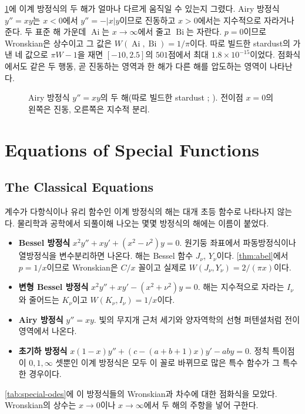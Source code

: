 \cref{fig:airy}에 이계 방정식의 두 해가 얼마나 다르게 움직일 수 있는지 그렸다. Airy 방정식 $y''=xy$는 $x<0$에서 $y''=-|x|y$이므로 진동하고 $x>0$에서는 지수적으로 자라거나 준다. 두 표준 해 가운데 $\operatorname{Ai}$는 $x\to\infty$에서 줄고 $\operatorname{Bi}$는 자란다. $p=0$이므로 Wronskian은 상수이고 그 값은 $W(\operatorname{Ai},\operatorname{Bi})=1/\pi$이다. 따로 빌드한 stardust의 가 낸 네 값으로 $\pi W-1$을 재면 $[-10,2.5]$의 $501$점에서 최대 $1.8\times10^{-15}$이었다. 점화식에서도 같은 두 행동, 곧 진동하는 영역과 한 해가 다른 해를 압도하는 영역이 나타난다.

\begin{figure}[htbp]
\centering
{}
\caption{Airy 방정식 $y''=xy$의 두 해(따로 빌드한 stardust ; ). 전이점 $x=0$의 왼쪽은 진동, 오른쪽은 지수적 분리.}
\label{fig:airy}
\end{figure}


\section{Equations of Special Functions}
\label{sec:special-odes}

\subsection{The Classical Equations}

계수가 다항식이나 유리 함수인 이계 방정식의 해는 대개 초등 함수로 나타나지 않는다. 물리학과 공학에서 되풀이해 나오는 몇몇 방정식의 해에는 이름이 붙었다.
\begin{itemize}
\item \textbf{Bessel 방정식} $x^2y''+xy'+(x^2-\nu^2)y=0$. 원기둥 좌표에서 파동방정식이나 열방정식을 변수분리하면 나온다. 해는 Bessel 함수 $J_\nu$, $Y_\nu$이다. \cref{thm:abel}에서 $p=1/x$이므로 Wronskian은 $C/x$ 꼴이고 실제로 $W(J_\nu,Y_\nu)=2/(\pi x)$이다\cite{watson1944bessel}.
\item \textbf{변형 Bessel 방정식} $x^2y''+xy'-(x^2+\nu^2)y=0$. 해는 지수적으로 자라는 $I_\nu$와 줄어드는 $K_\nu$이고 $W(K_\nu,I_\nu)=1/x$이다.
\item \textbf{Airy 방정식} $y''=xy$. 빛의 무지개 근처 세기와 양자역학의 선형 퍼텐셜처럼 전이 영역에서 나온다.
\item \textbf{초기하 방정식} $x(1-x)y''+(c-(a+b+1)x)y'-aby=0$. 정칙 특이점이 $0,1,\infty$ 셋뿐인 이계 방정식은 모두 이 꼴로 바뀌므로 많은 특수 함수가 그 특수한 경우이다.
\end{itemize}
\cref{tab:special-odes}에 이 방정식들의 Wronskian과 차수에 대한 점화식을 모았다. Wronskian의 상수는 $x\to0$이나 $x\to\infty$에서 두 해의 주항을 넣어 구한다.

